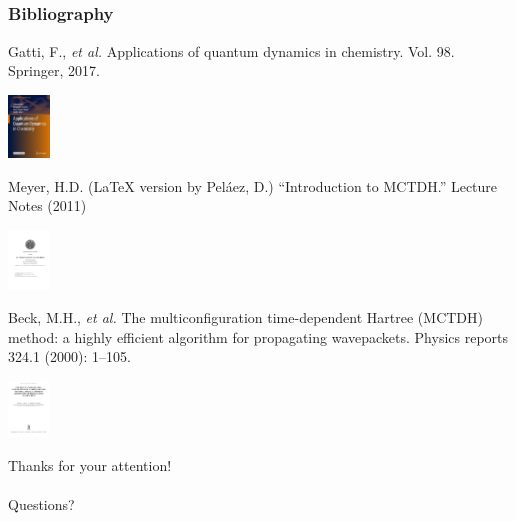 \documentclass{beamer}
\begin{document}
\subsection[Bibliography]{}\label{biblio}

\begin{frame}
  \frametitle{Bibliography}
  \centering
  \begin{minipage}{.6\linewidth}
\small{Gatti, F., \emph{et al.} Applications of quantum dynamics in chemistry. Vol. 98.
  Springer, 2017.}
\end{minipage}
\hspace{1cm}
  \begin{minipage}{.1\linewidth}
\includegraphics[width=3em]{appli.jpg}
\end{minipage}

\vspace{.5cm}

  \begin{minipage}{.6\linewidth}
\small{Meyer, H.D. (\LaTeX{} version by Pel\'aez, D.) ``Introduction to MCTDH.'' Lecture Notes (2011)}
 \end{minipage}
 \hspace{1cm}
   \begin{minipage}{.1\linewidth}
 \includegraphics[width=3em]{int_dan.pdf}
\end{minipage}
  
\vspace{.5cm}

  \begin{minipage}{.6\linewidth}
\small{Beck, M.H., \emph{et al.} The multiconfiguration time-dependent Hartree (MCTDH) method: a highly efficient algorithm for propagating wavepackets. Physics reports 324.1 (2000): 1--105.}
\end{minipage}
\hspace{1cm}
  \begin{minipage}{.1\linewidth}
\includegraphics[width=3em]{mctdh_rev.png}
  \end{minipage}
\end{frame}

\begin{frame}
  \centering \Large
  Thanks for your attention!  \\~\\
  Questions?
\end{frame}
\end{document}
